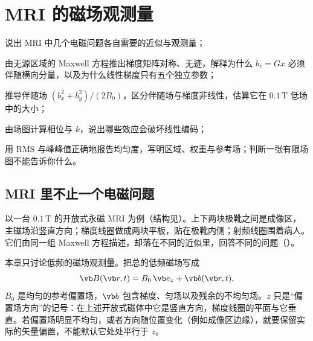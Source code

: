 \chapter{MRI 的磁场观测量}\label{ch:mri}

\begin{chapterguide}
\begin{guidegoals}
\item 说出 MRI 中几个电磁问题各自需要的近似与观测量；
\item 由无源区域的 Maxwell 方程推出梯度矩阵对称、无迹，解释为什么 $b_z=Gx$ 必须伴随横向分量，以及为什么线性梯度只有五个独立参数；
\item 推导伴随场 $(b_x^2+b_y^2)/(2B_0)$，区分伴随场与梯度非线性，估算它在 $0.1\,\mathrm T$ 低场中的大小；
\item 由场图计算相位与 $k$，说出哪些效应会破坏线性编码；
\item 用 RMS 与峰峰值正确地报告均匀度，写明区域、权重与参考场；判断一张有限场图不能告诉你什么。
\end{guidegoals}
\end{chapterguide}

\section{MRI 里不止一个电磁问题}\label{sec:mri-problems}

以一台 $0.1\,\mathrm T$ 的开放式永磁 MRI 为例（结构见）。上下两块极靴之间是成像区，主磁场沿竖直方向；梯度线圈做成两块平板，贴在极靴内侧；射频线圈围着病人。它们由同一组 Maxwell 方程描述，却落在不同的近似里，回答不同的问题（）。


本章只讨论低频的磁场观测量。把总的低频磁场写成
\begin{equation}
\vb B(\vb r,t)=B_0\,\vb e_z+\vb b(\vb r,t),
\label{eq:mri-bias}
\end{equation}
$B_0$ 是均匀的参考偏置场，$\vb b$ 包含梯度、匀场以及残余的不均匀场。$z$ 只是“偏置场方向”的记号：在上述开放式磁体中它是竖直方向，梯度线圈的平面与它垂直。若偏置场明显不均匀，或者方向随位置变化（例如成像区边缘），就要保留实际的矢量偏置，不能默认它处处平行于 $z$。

